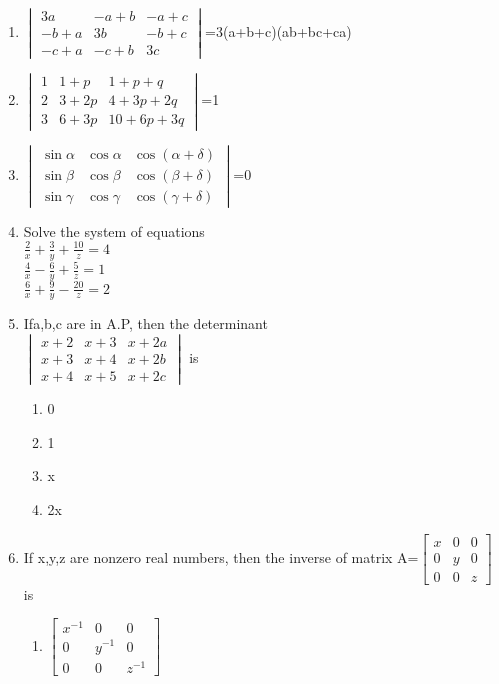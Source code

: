 \begin{enumerate}[label=\arabic*.,ref=\thesubsection.\theenumi]
\item $\begin{vmatrix}
3a&-a+b&-a+c \\ -b+a&3b&-b+c \\ -c+a&-c+b&3c
\end{vmatrix}$=3(a+b+c)(ab+bc+ca)\\
\solution 

\item $\begin{vmatrix}
1&1+p&1+p+q \\ 2&3+2p&4+3p+2q \\ 3&6+3p&10+6p+3q
\end{vmatrix}$=1\\
\item $\begin{vmatrix}\sin\alpha&\cos\alpha&\cos(\alpha+\delta) \\ \sin\beta&\cos\beta&\cos(\beta+\delta) \\ \sin\gamma&\cos\gamma&\cos(\gamma+\delta)\end{vmatrix}$=0\\
\item Solve the system of equations \\$\frac{2}{x}+\frac{3}{y}+\frac{10}{z}=4$\\$\frac{4}{x}-\frac{6}{y}+\frac{5}{z}=1$\\$\frac{6}{x}+\frac{9}{y}-\frac{20}{z}=2$\\
\item Ifa,b,c are in A.P, then the determinant\\
 $\begin{vmatrix}
x+2&x+3&x+2a \\ x+3&x+4&x+2b \\x+4&x+5&x+2c
\end{vmatrix}$ is 
\begin{enumerate}
\item 0
\item 1
\item x
\item 2x
\end{enumerate}
\item If x,y,z are nonzero real numbers, then the inverse of matrix 
A=$\begin{bmatrix}
x&0&0 \\ 0&y&0 \\ 0&0&z
\end{bmatrix}$ is 
\begin{enumerate}
\item $\begin{bmatrix} x^{-1}&0&0 \\ 0&y^{-1}&0 \\ 0&0&z^{-1} \end{bmatrix}$ 

\end{enumerate}
\end{enumerate}
